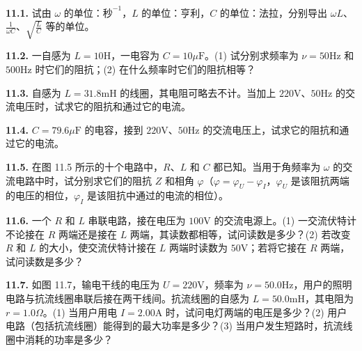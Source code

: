 \textbf{11.1.} 试由 $\omega$ 的单位：$\text{秒}^{-1}$，$L$ 的单位：亨利，$C$ 的单位：法拉，分别导出 $\omega L$、$\displaystyle \frac{1}{\omega C}$、$\displaystyle \sqrt{\frac{L}{C}}$ 等的单位。

\vfill
\newpage

\textbf{11.2.} 一自感为 $L = 10\mathrm{H}$，一电容为 $C = 10\mu\mathrm{F}$。(1) 试分别求频率为 $\nu = 50\mathrm{Hz}$ 和 $500\mathrm{Hz}$ 时它们的阻抗；(2) 在什么频率时它们的阻抗相等？

\vfill
\newpage

\textbf{11.3.} 自感为 $L = 31.8\mathrm{mH}$ 的线圈，其电阻可略去不计。当加上 $220\mathrm{V}$、$50\mathrm{Hz}$ 的交流电压时，试求它的阻抗和通过它的电流。

\vfill
\newpage

\textbf{11.4.} $C = 79.6\mu\mathrm{F}$ 的电容，接到 $220\mathrm{V}$、$50\mathrm{Hz}$ 的交流电压上，试求它的阻抗和通过它的电流。

\vfill
\newpage

\textbf{11.5.} 在图 11.5 所示的十个电路中，$R$、$L$ 和 $C$ 都已知。当用于角频率为 $\omega$ 的交流电路中时，试分别求它们的阻抗 $Z$ 和相角 $\varphi$（$\varphi = \varphi_{U} - \varphi_{I}$，$\varphi_{U}$ 是该阻抗两端的电压的相位，$\varphi_{I}$ 是该阻抗中通过的电流的相位）。

\begin{center}
\end{center}

\vfill
\newpage

\textbf{11.6.} 一个 $R$ 和 $L$ 串联电路，接在电压为 $100\mathrm{V}$ 的交流电源上。(1) 一交流伏特计不论接在 $R$ 两端还是接在 $L$ 两端，其读数都相等，试问读数是多少？(2) 若改变 $R$ 和 $L$ 的大小，使交流伏特计接在 $L$ 两端时读数为 $50\mathrm{V}$；若将它接在 $R$ 两端，试问读数是多少？

\vfill
\newpage

\textbf{11.7.} 如图 11.7，输电干线的电压为 $U = 220\mathrm{V}$，频率为 $\nu = 50.0\mathrm{Hz}$，用户的照明电路与抗流线圈串联后接在两干线间。抗流线圈的自感为 $L = 50.0\mathrm{mH}$，其电阻为 $r = 1.0\Omega$。(1) 当用户用电 $I = 2.00\mathrm{A}$ 时，试问电灯两端的电压是多少？(2) 用户电路（包括抗流线圈）能得到的最大功率是多少？(3) 当用户发生短路时，抗流线圈中消耗的功率是多少？

\begin{center}
\end{center}

